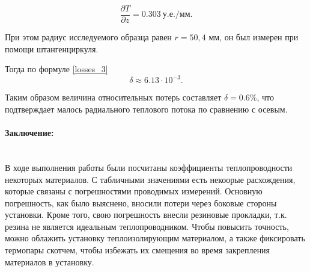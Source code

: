 \documentclass[a4paper, 12pt]{article}
\newcommand{\parag}[1]{\paragraph*{#1:}}
\begin{document}
\[ \frac{\partial T}{\partial z} = 0.303~у.е./мм. \]

При этом радиус исследуемого образца равен $r = 50,4 $ мм, он был измерен при помощи штангенциркуля.

Тогда по формуле \eqref{losses_3} \[ \delta \approx 6.13 \cdot 10^{-3}. \]

Таким образом величина относительных потерь составляет $ \delta = 0.6 \%$, что подтверждает малось радиального теплового потока по сравнению с осевым.


\parag {Заключение} ~\\
В ходе выполнения работы были посчитаны коэффициенты теплопроводности некоторых материалов. С табличными значениями есть некоорые расхождения, которые связаны с погрешностями проводимых измерений. Основную погрешность, как было выяснено, вносили потери через боковые стороны установки. Кроме того, свою погрешность внесли резиновые прокладки, т.к. резина не является идеальным теплопроводником. Чтобы повысить точность, можно облажить установку теплоизолирующим материалом, а также фиксировать термопары скотчем, чтобы избежать их смещения во время закрепления материалов в установку.
\end{document}
